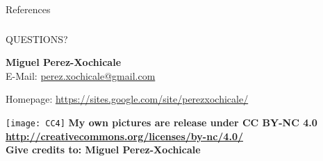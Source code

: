 \documentclass{beamer}
\begin{document}
 
 

 \begin{frame}{References}
  \nocite{*}
  
  
  


%  
\end{frame}





\begin{frame}
\frametitle{}

\vspace{2cm}
\begin{center}
\LARGE{QUESTIONS?} 
\end{center}

\vspace{1cm}

\normalsize 
\textbf{Miguel Perez-Xochicale} \\

E-Mail: {\color{blue} \href{mailto:perez.xochicale@gmail.com}{perez.xochicale@gmail.com} } 

Homepage:
{\color{blue} \href{https://sites.google.com/site/perezxochicale/}{https://sites.google.com/site/perezxochicale/} }
\vspace{1cm}


\texttt{[image: CC4]}
\tiny{ 
\textbf{My own pictures are release under CC BY-NC 4.0
{\color{blue} \href{http://creativecommons.org/licenses/by-nc/4.0/}{http://creativecommons.org/licenses/by-nc/4.0/} } \\
Give credits to: Miguel Perez-Xochicale
}
}

\end{frame}

% 
\end{document}
